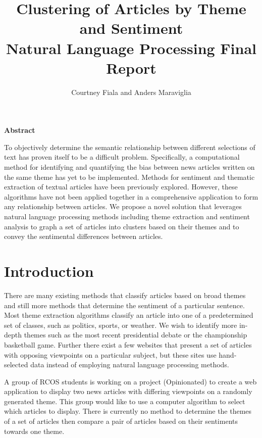\documentclass[12pt]{article}
\begin{document}
\title{Clustering of Articles by Theme and Sentiment \\ {\Large Natural Language Processing Final Report}}
\author{Courtney Fiala and Anders Maraviglia}

\maketitle

\begin{center}\textbf{Abstract}\end{center}
To objectively determine the semantic relationship between different selections of text has proven itself to be a difficult problem. Specifically, a computational method for identifying and quantifying the bias between news articles written on the same theme has yet to be implemented. Methods for sentiment and thematic extraction of textual articles have been previously explored. However, these algorithms have not been applied together in a comprehensive application to form any relationship between articles. We propose a novel solution that leverages natural language processing methods including theme extraction and sentiment analysis to graph a set of articles into clusters based on their themes and to convey the sentimental differences between articles.

\section{Introduction}
There are many existing methods that classify articles based on broad themes and still more methods that determine the sentiment of a particular sentence. Most theme extraction algorithms classify an article into one of a predetermined set of classes, such as politics, sports, or weather. We wish to identify more in-depth themes such as the most recent presidential debate or the championship basketball game. Further there exist a few websites that present a set of articles with opposing viewpoints on a particular subject, but these sites use hand-selected data instead of employing natural language processing methods.

A group of RCOS students is working on a project (Opinionated) to create a web application to display two news articles with differing viewpoints on a randomly generated theme. This group would like to use a computer algorithm to select which articles to display. There is currently no method to determine the themes of a set of articles then compare a pair of articles based on their sentiments towards one theme.
\end{document}
